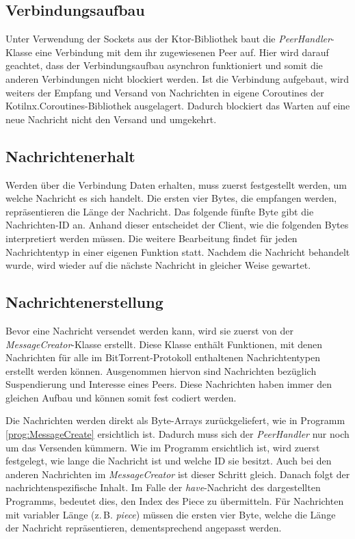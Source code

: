 \subsection{Verbindungsaufbau}

Unter Verwendung der Sockets aus der Ktor-Bibliothek baut die \emph{PeerHandler}-Klasse eine Verbindung mit dem ihr zugewiesenen Peer auf. Hier wird darauf geachtet, dass der Verbindungsaufbau asynchron funktioniert und somit die anderen Verbindungen nicht blockiert werden. Ist die Verbindung aufgebaut, wird weiters der Empfang und Versand von Nachrichten in eigene Coroutines der Kotilnx.Coroutines-Bibliothek ausgelagert. Dadurch blockiert das Warten auf eine neue Nachricht nicht den Versand und umgekehrt. 

\subsection{Nachrichtenerhalt}

Werden über die Verbindung Daten erhalten, muss zuerst festgestellt werden, um welche Nachricht es sich handelt. Die ersten vier Bytes, die empfangen werden, repräsentieren die Länge der Nachricht. Das folgende fünfte Byte gibt die Nachrichten-ID an. Anhand dieser entscheidet der Client, wie die folgenden Bytes interpretiert werden müssen. Die weitere Bearbeitung findet für jeden Nachrichtentyp in einer eigenen Funktion statt. Nachdem die Nachricht behandelt wurde, wird wieder auf die nächste Nachricht in gleicher Weise gewartet. 

\subsection{Nachrichtenerstellung}

Bevor eine Nachricht versendet werden kann, wird sie zuerst von der \emph{MessageCreator}-Klasse erstellt. Diese Klasse enthält Funktionen, mit denen Nachrichten für alle im BitTorrent-Protokoll enthaltenen Nachrichtentypen erstellt werden können. Ausgenommen hiervon sind Nachrichten bezüglich Suspendierung und Interesse eines Peers. Diese Nachrichten haben immer den gleichen Aufbau und können somit fest codiert werden.

Die Nachrichten werden direkt als Byte-Arrays zurückgeliefert, wie in Programm \ref{prog:MessageCreate} ersichtlich ist. Dadurch muss sich der \emph{PeerHandler} nur noch um das Versenden kümmern. Wie im Programm ersichtlich ist, wird zuerst festgelegt, wie lange die Nachricht ist und welche ID sie besitzt. Auch bei den anderen Nachrichten im \emph{MessageCreator} ist dieser Schritt gleich. Danach folgt der nachrichtenspezifische Inhalt. Im Falle der \emph{have}-Nachricht des dargestellten Programms, bedeutet dies, den Index des Piece zu übermitteln. Für Nachrichten mit variabler Länge (z.\,B. \emph{piece}) müssen die ersten vier Byte, welche die Länge der Nachricht repräsentieren, dementsprechend angepasst werden. 

